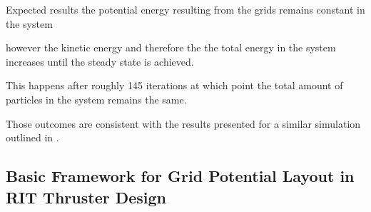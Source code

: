 Expected results the potential energy resulting from the grids remains constant in the system

however the kinetic energy and therefore the the total energy in the system increases until the steady state is achieved.

This happens after roughly 145 iterations at which point the total amount of particles in the system remains the same.

Those outcomes are consistent with the results presented for a similar simulation outlined in \cite{brieda_plasma_2019}.

\subsection{Basic Framework for Grid Potential Layout in RIT Thruster Design}



